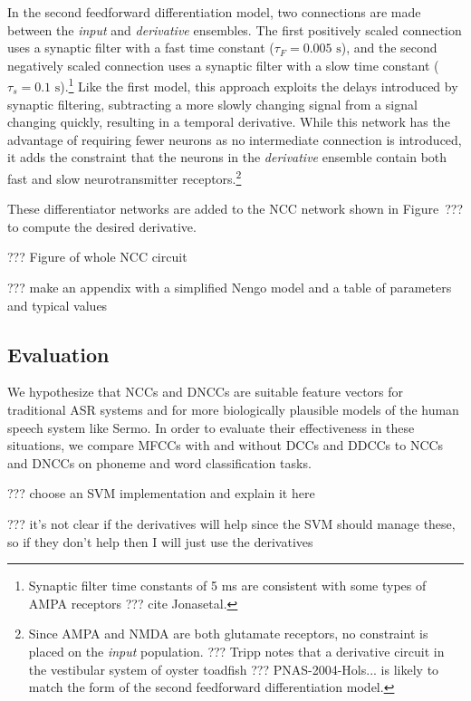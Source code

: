 In the second feedforward differentiation model,
two connections are made between
the \textit{input} and \textit{derivative} ensembles.
The first positively scaled connection
uses a synaptic filter with a fast time constant
($\tau_F=0.005 \text{ s}$),
and the second negatively scaled connection
uses a synaptic filter with a slow time constant
($\tau_s=0.1 \text{ s}$).\footnote{
  Synaptic filter time constants of 5 ms
  are consistent with some types of
  AMPA receptors ??? cite Jonasetal.}
Like the first model,
this approach exploits the delays introduced
by synaptic filtering,
subtracting a more slowly changing signal
from a signal changing quickly,
resulting in a temporal derivative.
While this network has the advantage
of requiring fewer neurons
as no intermediate connection is introduced,
it adds the constraint that
the neurons in the \textit{derivative} ensemble
contain both fast and slow
neurotransmitter receptors.\footnote{
  Since AMPA and NMDA are both glutamate receptors,
  no constraint is placed on the \textit{input} population.
  ??? Tripp notes that a derivative circuit
  in the vestibular system of oyster toadfish
  ??? PNAS-2004-Hols...
  is likely to match the form of the second
  feedforward differentiation model.}

These differentiator networks
are added to the NCC network
shown in Figure~???
to compute the desired derivative.

??? Figure of whole NCC circuit


??? make an appendix with a simplified Nengo model
and a table of parameters and typical values

\subsection{Evaluation}

We hypothesize that NCCs and DNCCs
are suitable feature vectors
for traditional ASR systems
and for more biologically plausible
models of the human speech system like Sermo.
In order to evaluate their effectiveness
in these situations,
we compare MFCCs with and without DCCs
and DDCCs to NCCs and DNCCs
on phoneme and word classification tasks.

??? choose an SVM implementation and
explain it here

??? it's not clear if the derivatives will help
since the SVM should manage these,
so if they don't help then I will
just use the derivatives

